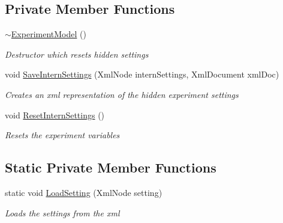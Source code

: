 \subsection*{Private Member Functions}
\begin{DoxyCompactItemize}
\item 
\hyperlink{class_web_analyzer_1_1_models_1_1_base_1_1_experiment_model_a08740ebbb438a9d8300bc537017c72c2}{$\sim$\+Experiment\+Model} ()
\begin{DoxyCompactList}\small\item\em Destructor which resets hidden settings \end{DoxyCompactList}\item 
void \hyperlink{class_web_analyzer_1_1_models_1_1_base_1_1_experiment_model_a7a634ff267195bc2b3af083d6d20d81c}{Save\+Intern\+Settings} (Xml\+Node intern\+Settings, Xml\+Document xml\+Doc)
\begin{DoxyCompactList}\small\item\em Creates an xml representation of the hidden experiment settings \end{DoxyCompactList}\item 
void \hyperlink{class_web_analyzer_1_1_models_1_1_base_1_1_experiment_model_acf8637b65ca6f75a4fc412f7290e0091}{Reset\+Intern\+Settings} ()
\begin{DoxyCompactList}\small\item\em Resets the experiment variables \end{DoxyCompactList}\end{DoxyCompactItemize}
\subsection*{Static Private Member Functions}
\begin{DoxyCompactItemize}
\item 
static void \hyperlink{class_web_analyzer_1_1_models_1_1_base_1_1_experiment_model_a63429921e06c48ec66370f615d235bea}{Load\+Setting} (Xml\+Node setting)
\begin{DoxyCompactList}\small\item\em Loads the settings from the xml \end{DoxyCompactList}\end{DoxyCompactItemize}
